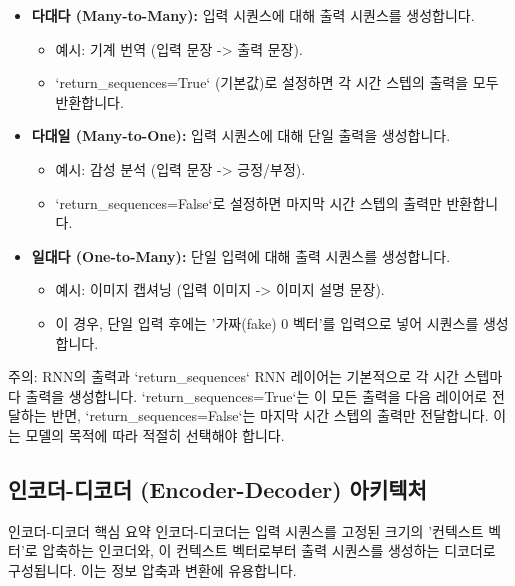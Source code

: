 \documentclass[11pt,a4paper]{article}
\begin{document}
\begin{itemize}
    \item \textbf{다대다 (Many-to-Many):} 입력 시퀀스에 대해 출력 시퀀스를 생성합니다.
        \begin{itemize}
            \item 예시: 기계 번역 (입력 문장 -> 출력 문장).
            \item `return_sequences=True` (기본값)로 설정하면 각 시간 스텝의 출력을 모두 반환합니다.
        \end{itemize}
    \item \textbf{다대일 (Many-to-One):} 입력 시퀀스에 대해 단일 출력을 생성합니다.
        \begin{itemize}
            \item 예시: 감성 분석 (입력 문장 -> 긍정/부정).
            \item `return_sequences=False`로 설정하면 마지막 시간 스텝의 출력만 반환합니다.
        \end{itemize}
    \item \textbf{일대다 (One-to-Many):} 단일 입력에 대해 출력 시퀀스를 생성합니다.
        \begin{itemize}
            \item 예시: 이미지 캡셔닝 (입력 이미지 -> 이미지 설명 문장).
            \item 이 경우, 단일 입력 후에는 '가짜(fake) 0 벡터'를 입력으로 넣어 시퀀스를 생성합니다.
        \end{itemize}
\end{itemize}

\begin{cautionbox}{주의: RNN의 출력과 `return_sequences`}
RNN 레이어는 기본적으로 각 시간 스텝마다 출력을 생성합니다. `return_sequences=True`는 이 모든 출력을 다음 레이어로 전달하는 반면, `return_sequences=False`는 마지막 시간 스텝의 출력만 전달합니다. 이는 모델의 목적에 따라 적절히 선택해야 합니다.
\end{cautionbox}

\subsection{인코더-디코더 (Encoder-Decoder) 아키텍처}
\begin{summarybox}{인코더-디코더 핵심 요약}
인코더-디코더는 입력 시퀀스를 고정된 크기의 '컨텍스트 벡터'로 압축하는 인코더와, 이 컨텍스트 벡터로부터 출력 시퀀스를 생성하는 디코더로 구성됩니다. 이는 정보 압축과 변환에 유용합니다.
\end{summarybox}
\end{document}
